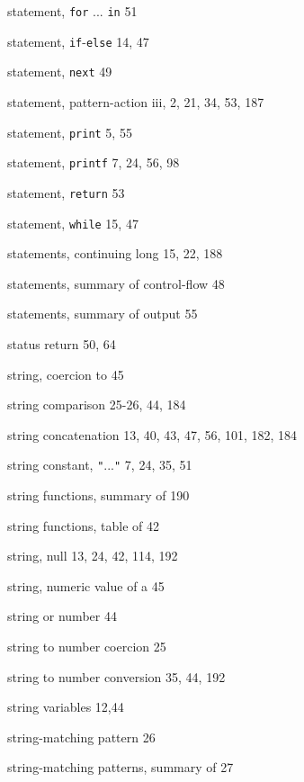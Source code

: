 \begin{multicols}{3}
\hangindent=3pc  statement, \verb'for' ... \verb'in' 51

\hangindent=3pc  statement, \verb'if'-\verb'else' 14, 47

\hangindent=3pc  statement, \verb'next' 49

\hangindent=3pc  statement, pattern-action iii, 2, 21, 34, 53, 187

\hangindent=3pc  statement, \verb'print' 5, 55

\hangindent=3pc  statement, \verb'printf' 7, 24, 56, 98

\hangindent=3pc  statement, \verb'return' 53

\hangindent=3pc  statement, \verb'while' 15, 47

\hangindent=3pc  statements, continuing long 15, 22, 188

\hangindent=3pc  statements, summary of control-flow 48

\hangindent=3pc  statements, summary of output 55

\hangindent=3pc  status return 50, 64

\hangindent=3pc  string, coercion to 45

\hangindent=3pc  string comparison 25-26, 44, 184

\hangindent=3pc  string concatenation 13, 40, 43,  47, 56, 101, 182, 184

\hangindent=3pc  string constant, \verb'"'...\verb'"' 7, 24, 35, 51

\hangindent=3pc  string functions, summary of 190

\hangindent=3pc  string functions, table of 42

\hangindent=3pc  string, null 13, 24, 42, 114, 192

\hangindent=3pc  string, numeric value of a 45

\hangindent=3pc  string or number 44

\hangindent=3pc  string to number coercion 25

\hangindent=3pc  string to number conversion 35, 44, 192

\hangindent=3pc  string variables 12,44

\hangindent=3pc  string-matching pattern 26

\hangindent=3pc  string-matching patterns, summary of 27


\end{multicols}
